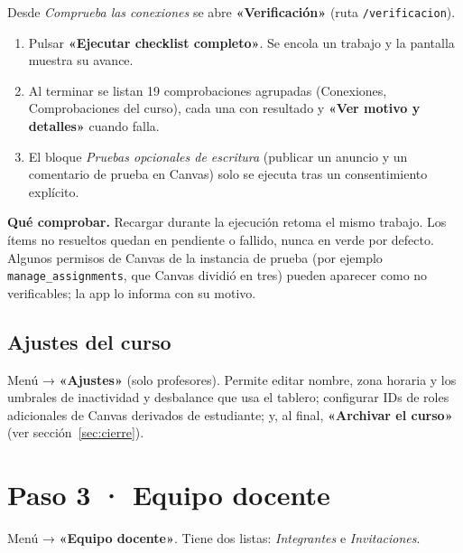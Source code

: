 \documentclass[11pt,a4paper]{article}
\newenvironment{comprobar}
  {\def\FrameCommand{\fcolorbox{verde}{verdefondo}}\MakeFramed{\advance\hsize-\width\FrameRestore}\noindent\textbf{\textcolor{verde}{Qué comprobar.}} }
  {\endMakeFramed}
\newcommand{\ui}[1]{\textbf{«#1»}}        %
\newcommand{\ruta}[1]{\texttt{#1}}        %
\begin{document}
Desde \emph{Comprueba las conexiones} se abre \ui{Verificación} (ruta \ruta{/verificacion}).

\begin{enumerate}
  \item Pulsar \ui{Ejecutar checklist completo}. Se encola un trabajo y la pantalla muestra su avance.
  \item Al terminar se listan 19 comprobaciones agrupadas (Conexiones, Comprobaciones del curso), cada una con resultado y \ui{Ver motivo y detalles} cuando falla.
  \item El bloque \emph{Pruebas opcionales de escritura} (publicar un anuncio y un comentario de prueba en Canvas) solo se ejecuta tras un consentimiento explícito.
\end{enumerate}

\begin{comprobar}
Recargar durante la ejecución retoma el mismo trabajo. Los ítems no resueltos quedan en pendiente o fallido, nunca en verde por defecto. Algunos permisos de Canvas de la instancia de prueba (por ejemplo \texttt{manage\_assignments}, que Canvas dividió en tres) pueden aparecer como no verificables; la app lo informa con su motivo.
\end{comprobar}

\subsection{Ajustes del curso}

Menú → \ui{Ajustes} (solo profesores). Permite editar nombre, zona horaria y los umbrales de inactividad y desbalance que usa el tablero; configurar IDs de roles adicionales de Canvas derivados de estudiante; y, al final, \ui{Archivar el curso} (ver sección~\ref{sec:cierre}).

\section{Paso 3 · Equipo docente}

Menú → \ui{Equipo docente}. Tiene dos listas: \emph{Integrantes} e \emph{Invitaciones}.
\end{document}
